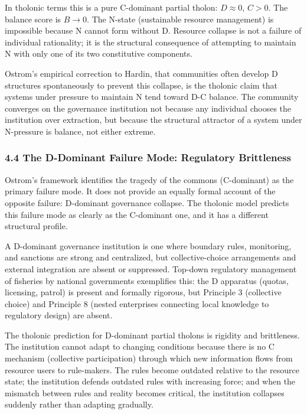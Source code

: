 \documentclass[
  11pt,
  letterpaper,
]{article}
\begin{document}
In tholonic terms this is a pure C-dominant partial tholon:
\(D \approx 0\), \(C > 0\). The balance score is \(B \to 0\). The
N-state (sustainable resource management) is impossible because N cannot
form without D. Resource collapse is not a failure of individual
rationality; it is the structural consequence of attempting to maintain
N with only one of its two constitutive components.

Ostrom's empirical correction to Hardin, that communities often develop
D structures spontaneously to prevent this collapse, is the tholonic
claim that systems under pressure to maintain N tend toward D-C balance.
The community converges on the governance institution not because any
individual chooses the institution over extraction, but because the
structural attractor of a system under N-pressure is balance, not either
extreme.

\subsubsection{4.4 The D-Dominant Failure Mode: Regulatory
Brittleness}\label{the-d-dominant-failure-mode-regulatory-brittleness}

Ostrom's framework identifies the tragedy of the commons (C-dominant) as
the primary failure mode. It does not provide an equally formal account
of the opposite failure: D-dominant governance collapse. The tholonic
model predicts this failure mode as clearly as the C-dominant one, and
it has a different structural profile.

A D-dominant governance institution is one where boundary rules,
monitoring, and sanctions are strong and centralized, but
collective-choice arrangements and external integration are absent or
suppressed. Top-down regulatory management of fisheries by national
governments exemplifies this: the D apparatus (quotas, licensing,
patrol) is present and formally rigorous, but Principle 3 (collective
choice) and Principle 8 (nested enterprises connecting local knowledge
to regulatory design) are absent.

The tholonic prediction for D-dominant partial tholons is rigidity and
brittleness. The institution cannot adapt to changing conditions because
there is no C mechanism (collective participation) through which new
information flows from resource users to rule-makers. The rules become
outdated relative to the resource state; the institution defends
outdated rules with increasing force; and when the mismatch between
rules and reality becomes critical, the institution collapses suddenly
rather than adapting gradually.
\end{document}
